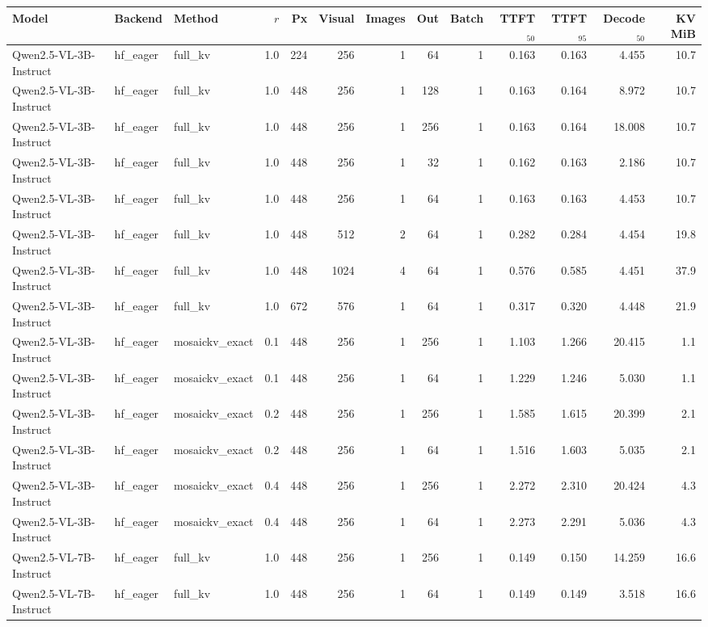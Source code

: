 \begin{tabular}{lllrrrrrrrrrr}
\toprule
Model & Backend & Method & $r$ & Px & Visual & Images & Out & Batch & TTFT$_{50}$ & TTFT$_{95}$ & Decode$_{50}$ & KV MiB \\
\midrule
Qwen2.5-VL-3B-Instruct & hf\_eager & full\_kv & 1.0 & 224 & 256 & 1 & 64 & 1 & 0.163 & 0.163 & 4.455 & 10.7 \\
Qwen2.5-VL-3B-Instruct & hf\_eager & full\_kv & 1.0 & 448 & 256 & 1 & 128 & 1 & 0.163 & 0.164 & 8.972 & 10.7 \\
Qwen2.5-VL-3B-Instruct & hf\_eager & full\_kv & 1.0 & 448 & 256 & 1 & 256 & 1 & 0.163 & 0.164 & 18.008 & 10.7 \\
Qwen2.5-VL-3B-Instruct & hf\_eager & full\_kv & 1.0 & 448 & 256 & 1 & 32 & 1 & 0.162 & 0.163 & 2.186 & 10.7 \\
Qwen2.5-VL-3B-Instruct & hf\_eager & full\_kv & 1.0 & 448 & 256 & 1 & 64 & 1 & 0.163 & 0.163 & 4.453 & 10.7 \\
Qwen2.5-VL-3B-Instruct & hf\_eager & full\_kv & 1.0 & 448 & 512 & 2 & 64 & 1 & 0.282 & 0.284 & 4.454 & 19.8 \\
Qwen2.5-VL-3B-Instruct & hf\_eager & full\_kv & 1.0 & 448 & 1024 & 4 & 64 & 1 & 0.576 & 0.585 & 4.451 & 37.9 \\
Qwen2.5-VL-3B-Instruct & hf\_eager & full\_kv & 1.0 & 672 & 576 & 1 & 64 & 1 & 0.317 & 0.320 & 4.448 & 21.9 \\
Qwen2.5-VL-3B-Instruct & hf\_eager & mosaickv\_exact & 0.1 & 448 & 256 & 1 & 256 & 1 & 1.103 & 1.266 & 20.415 & 1.1 \\
Qwen2.5-VL-3B-Instruct & hf\_eager & mosaickv\_exact & 0.1 & 448 & 256 & 1 & 64 & 1 & 1.229 & 1.246 & 5.030 & 1.1 \\
Qwen2.5-VL-3B-Instruct & hf\_eager & mosaickv\_exact & 0.2 & 448 & 256 & 1 & 256 & 1 & 1.585 & 1.615 & 20.399 & 2.1 \\
Qwen2.5-VL-3B-Instruct & hf\_eager & mosaickv\_exact & 0.2 & 448 & 256 & 1 & 64 & 1 & 1.516 & 1.603 & 5.035 & 2.1 \\
Qwen2.5-VL-3B-Instruct & hf\_eager & mosaickv\_exact & 0.4 & 448 & 256 & 1 & 256 & 1 & 2.272 & 2.310 & 20.424 & 4.3 \\
Qwen2.5-VL-3B-Instruct & hf\_eager & mosaickv\_exact & 0.4 & 448 & 256 & 1 & 64 & 1 & 2.273 & 2.291 & 5.036 & 4.3 \\
Qwen2.5-VL-7B-Instruct & hf\_eager & full\_kv & 1.0 & 448 & 256 & 1 & 256 & 1 & 0.149 & 0.150 & 14.259 & 16.6 \\
Qwen2.5-VL-7B-Instruct & hf\_eager & full\_kv & 1.0 & 448 & 256 & 1 & 64 & 1 & 0.149 & 0.149 & 3.518 & 16.6 \\

\end{tabular}
